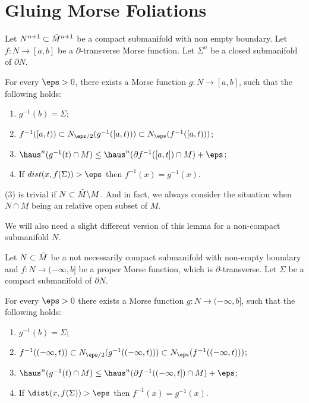 \section{Gluing Morse Foliations}
\begin{lemma}\label{lem:morse-foliation-1}
    Let $N^{n + 1} \subset \Tilde{M}^{n + 1}$ be a compact submanifold with non empty boundary. Let $f: N \to [a, b]$ be a $\partial$-transverse Morse function. Let $\Sigma^n$ be a closed submanifold of $\partial N$.

    For every $\eps > 0$, there exists a Morse function $g: N \to [a, b]$, such that the following holds:
    \begin{enumerate}
        \item[(1)] $g^{-1}(b) = \Sigma$;
        \item[(2)] $f^{-1}([a, t)) \subset N_{\eps/2}(g^{-1}([a, t))) \subset N_\eps(f^{-1}([a, t)))$;
        \item[(3)] $\haus^n(g^{-1}(t)\cap M) \leq \haus^n(\partial f^{-1}([a, t])\cap M) + \eps$;
        \item[(4)] If $dist(x, f(\Sigma)) > \eps$ then $f^{-1}(x) = g^{-1}(x)$. 
    \end{enumerate}
\end{lemma}
\begin{remark}
    (3) is trivial if $N \subset \Tilde{M}\backslash M$. And in fact, we always consider the situation when $N\cap M$ being an relative open subset of $M$.
\end{remark}
We will also need a slight different version of this lemma for a non-compact submanifold $N$.
\begin{lemma}\label{lem:morse-foliation-non-compact}
    Let $N \subset \Tilde{M}$ be a not necessarily compact submanifold with non-empty boundary and $f: N \to (-\infty, b]$ be a proper Morse function, which is $\partial$-transverse. Let $\Sigma$ be a compact submanifold of $\partial N$.

    For every $\eps > 0$ there exists a Morse function $g: N \to (-\infty, b]$, such that the following holds:
    \begin{enumerate}
        \item[(1)] $g^{-1}(b) = \Sigma$;
        \item[(2)] $f^{-1}((-\infty, t)) \subset N_{\eps/2}(g^{-1}((-\infty, t))) \subset N_\eps(f^{-1}((-\infty, t)))$;
        \item[(3)] $\haus^n(g^{-1}(t)\cap M) \leq \haus^n(\partial f^{-1}((-\infty, t])\cap M) + \eps$;
        \item[(4)] If $\dist(x, f(\Sigma)) > \eps$ then $f^{-1}(x) = g^{-1}(x)$. 
    \end{enumerate}
\end{lemma}
